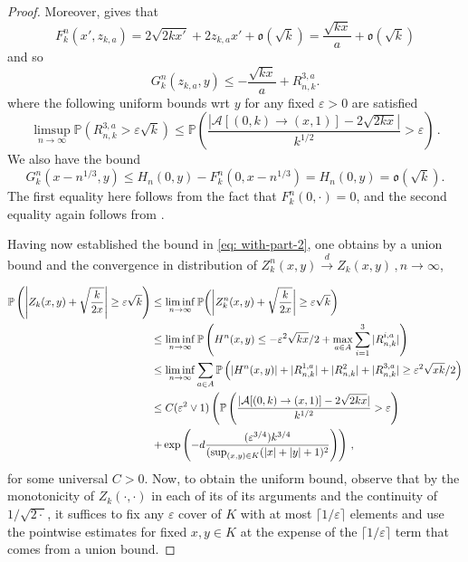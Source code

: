 \documentclass[11pt, reqno]{amsart}
\numberwithin{equation}{section}
\newcommand{\PP}{\ensuremath{\mathbb{P}}}
\begin{document}
\begin{proof}
Moreover, \cite[Proposition 6.1]{DOV} gives that
$$
F^n_k(x', z_{k, a}) = 2 \sqrt{2 k x'} + 2 z_{k, a}  x' + \mathfrak{o}(\sqrt{k}) = \frac{\sqrt{kx}}{a}  + \mathfrak{o}(\sqrt{k})
$$
and so
\begin{equation*}
    G^n_k(z_{k, a}, y) \le -\frac{\sqrt{kx}}a  + R^{3,a}_{n,k}.
\end{equation*}
where the following uniform bounds wrt $y$ for any fixed $\varepsilon > 0$ are satisfied
\begin{equation*}
\displaystyle\limsup_{n\to\infty}\PP(R^{3,a}_{n,k}>\varepsilon \sqrt{k})\le \PP \left(\frac{|\mathcal{A}[ (0, k) \rightarrow (x,1) ]-{2\sqrt{2kx}}|}{k^{1/2}} > \varepsilon\right)\,.
\end{equation*}
We also have the bound
\begin{equation*}
    G^n_k(x - n^{1/3}, y) \le H_n(0, y) - F^n_k(0, x - n^{1/3}) = H_n(0, y) = \mathfrak{o}(\sqrt{k}).
\end{equation*}
The first equality here follows from the fact that  $F^n_k(0,\cdot)=0$, and the second equality again follows from \cite[Theorem~2.5]{DOV}.

Having now established the bound in \eqref{eq: with-part-2}, one obtains by a union bound and the convergence in distribution of $Z^n_k(x,y)\stackrel{d}{\rightarrow}Z_k(x,y)\,,n\to \infty$,

\begin{align*}
\PP\left( \left|Z_k(x, y) +\sqrt{\frac{k}{2x}}\right| \ge \varepsilon \sqrt{k}\right) &\le \displaystyle\liminf_{n\to \infty}\PP\bigg(\bigg|Z^n_k(x,y)+\sqrt{\frac{k}{2x}}\bigg|\ge  \varepsilon \sqrt{k}\bigg)\\
&\le \displaystyle\liminf_{n\to\infty}\PP\left( H^n(x,y)\le -\varepsilon^2\sqrt{kx}/2 + \displaystyle\displaystyle\max_{a\in A}\displaystyle\sum_{i=1}^3 |R^{i,a}_{n,k}|\right)\\
&  \le \liminf_{n\to\infty}\displaystyle\sum_{a\in A}\PP\left( |H^n(x, y)| + |R^{1,a}_{n,k}|+ |R^{2}_{n,k}|+ |R^{3,a}_{n,k}| \ge \varepsilon^2\sqrt{xk}/2\right)\\
& \le C (\varepsilon^2 \lor 1)\left( \PP \left(\frac{|\mathcal{A}[ (0, k) \rightarrow (x,1) ]-{2\sqrt{2kx}}|}{k^{1/2}} > \varepsilon\right)\right.\\
& \left.+  \exp\left(-d\frac{(\varepsilon^{3/4}) k^{3/4}}{(\sup_{(x,y)\in K} (|x| + |y| + 1)^2}\right)\right)\,,
\end{align*}
for some universal $C>0$. Now, to obtain the uniform bound, observe that by the monotonicity of $Z_k(\cdot, \cdot)$ in each of its of its arguments and the continuity of $1/\sqrt{2\cdot}$, it suffices to fix any $\varepsilon$ cover of $K$ with at most $\lceil 1/\varepsilon \rceil$ elements and use the pointwise estimates for fixed $x,y\in K$ at the expense of the $\lceil 1/\varepsilon \rceil$ term that comes from a union bound.
\end{proof}
\end{document}
